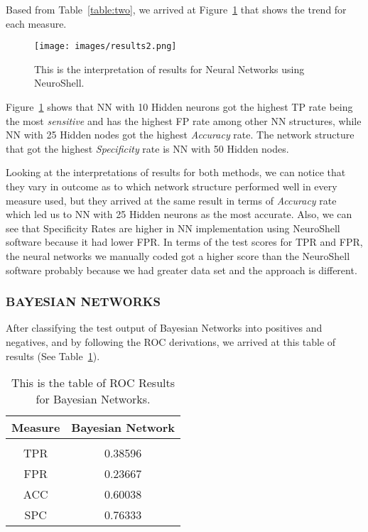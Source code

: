 \documentclass[journal]{./IEEE/IEEEtran}
\begin{document}
	Based from Table~\ref{table:two}, we arrived at Figure~\ref{fig:nnetworks2} that shows the trend for each measure.
\begin{figure}[h]
\begin{center}
\texttt{[image: images/results2.png]}
\caption{This is the interpretation of results for Neural Networks using NeuroShell.}
\label{fig:nnetworks2}
\end{center}
\end{figure}

Figure~\ref{fig:nnetworks2} shows that NN with 10 Hidden neurons got the highest TP rate being the most {\it sensitive} and has the highest FP rate among other NN structures, while NN with 25 Hidden nodes got the highest {\it Accuracy} rate. The network structure that got the highest {\it Specificity} rate is NN with 50 Hidden nodes.

Looking at the interpretations of results for both methods, we can notice that they vary in outcome as to which network structure performed well in every measure used, but they arrived at the same result in terms of {\it Accuracy} rate which led us to NN with 25 Hidden neurons as the most accurate. Also, we can see that Specificity Rates are higher in NN implementation using NeuroShell software because it had lower FPR. In terms of the test scores for TPR and FPR, the neural networks we manually coded got a higher score than the NeuroShell software probably because we had greater data set and the approach is different.

\subsubsection {BAYESIAN NETWORKS}
After classifying the test output of Bayesian Networks into positives and negatives, and by following the ROC derivations, we arrived at this table of results (See Table~\ref{table:three}).

\begin{table}[ht] 
\caption{This is the table of ROC Results for Bayesian Networks.} %
\centering 
\begin{tabular}{c c } 
\hline\hline %
Measure & Bayesian Network\\ [0.5ex] %
\hline\\[0.1ex] %
TPR & 0.38596 \\ %
FPR & 0.23667 \\ 
ACC & 0.60038 \\ 
SPC & 0.76333 \\[1ex] %
\hline %
\end{tabular} 
\label{table:three} %
\end{table} 
\end{document}
